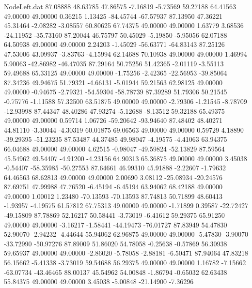 \begin{filecontents}{NodeLeft.dat}
  87.08888   48.63785   47.86575    -7.16819   -5.73569   59.27188   64.41563   49.00000   49.00000    0.36215    1.13425  -84.45744  -67.57937
  87.13950   47.36221   45.31464    -2.08282   -3.08557   60.80625   67.74375   49.00000   49.00000    1.63779    3.68536  -24.11952  -35.73160
  87.20044   46.75797   50.45029    -5.19850   -5.95056   62.07188   64.50938   49.00000   49.00000    2.24203   -1.45029  -56.63771  -64.83143
  87.25126   47.53006   43.09937    -3.83763   -4.15994   62.14688   70.10938   49.00000   49.00000    1.46994    5.90063  -42.86982  -46.47035
  87.29164   50.75256   51.42365    -2.01119   -3.55113   59.49688   65.33125   49.00000   49.00000   -1.75256   -2.42365  -22.56953  -39.85064
  87.34236   49.94675   51.79321    -4.66131   -5.01944   59.21563   62.98125   49.00000   49.00000   -0.94675   -2.79321  -54.59304  -58.78739
  87.39289   51.79306   50.21545    -0.75776   -1.11588   57.32500   63.51875   49.00000   49.00000   -2.79306   -1.21545   -8.78709  -12.93998
  87.44347   48.40286   47.93274    -5.12688   -8.13512   59.32188   65.49375   49.00000   49.00000    0.59714    1.06726  -59.20642  -93.94640
  87.48402   48.40271   44.81110    -3.30044   -4.30319   60.01875   69.06563   49.00000   49.00000    0.59729    4.18890  -39.29395  -51.23235
  87.53487   44.37485   49.98047    -4.19575   -4.41063   63.94375   66.04688   49.00000   49.00000    4.62515   -0.98047  -49.59824  -52.13829
  87.59564   45.54962   49.54407    -4.91200   -4.23156   64.90313   65.36875   49.00000   49.00000    3.45038   -0.54407  -58.35985  -50.27553
  87.64661   46.99310   45.91888    -2.22607   -1.79632   64.46563   68.62813   49.00000   49.00000    2.00690    3.08112  -25.08934  -20.24576
  87.69751   47.99988   47.76520    -6.45194   -6.45194   63.94062   68.42188   49.00000   49.00000    1.00012    1.23480  -70.13593  -70.13593
  87.74813   50.71899   48.60413    -1.93957   -4.19575   61.57812   67.75313   49.00000   49.00000   -1.71899    0.39587  -22.72427  -49.15809
  87.78869   52.16217   50.58441    -3.73019   -6.41612   59.29375   65.91250   49.00000   49.00000   -3.16217   -1.58441  -44.19473  -76.01727
  87.83949   54.47830   52.90070    -2.94232   -4.44644   55.94062   62.96875   49.00000   49.00000   -5.47830   -3.90070  -33.72990  -50.97276
  87.89009   51.86020   54.78058    -0.25638   -0.57869   56.30938   59.65937   49.00000   49.00000   -2.86020   -5.78058   -2.88181   -6.50471
  87.94064   47.83218   56.15662    -5.41338   -3.73019   59.54688   56.29375   49.00000   49.00000    1.16782   -7.15662  -63.07734  -43.46465
  88.00137   45.54962   54.00848    -1.86794   -0.65032   62.63438   55.84375   49.00000   49.00000    3.45038   -5.00848  -21.14900   -7.36296

\end{filecontents}
